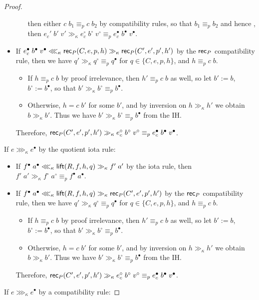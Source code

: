 \begin{proof}
\begin{itemize}
\begin{itemize}
then either $c\;b_1\equiv_p c\;b_2$ by compatibility rules, so that $b_1\equiv_p b_2$ and hence , then $e_c'\;b'\;v'\gg_\kappa e_c^\circ\;b^\circ\;v^\circ\equiv_p e_c^\bullet\;b^\bullet\;v^\bullet$.
\end{itemize}
\item If $e_c^\bullet\;b^\bullet\;v^\bullet\lll_\kappa \mathsf{rec}_P(C,e,p,h)\gg_\kappa \mathsf{rec}_P(C',e',p',h')$ by the $\mathsf{rec}_P$ compatibility rule, then we have $q'\gg_\kappa q^\circ\equiv_p q^\bullet$ for $q\in\{C,e,p,h\}$, and $h\equiv_p c\;b$.
\begin{itemize}
\item If $h\equiv_p c\;b$ by proof irrelevance, then $h'\equiv_p c\;b$ as well, so let $b':=b$, $b^\circ:=b^\bullet$, so that $b'\gg_\kappa b^\circ\equiv_p b^\bullet$.
\item Otherwise, $h=c\;b'$ for some $b'$, and by inversion on $h\gg_\kappa h'$ we obtain $b\gg_\kappa b'$. Thus we have $b'\gg_\kappa b^\circ\equiv_p b^\bullet$ from the IH.
\end{itemize}
Therefore, $\mathsf{rec}_P(C',e',p',h')\gg_\kappa e_c^\circ\;b^\circ\;v^\circ\equiv_p e_c^\bullet\;b^\bullet\;v^\bullet$.
\end{itemize}
\item If $e\ggg_\kappa e^\bullet$ by the quotient iota rule:
\begin{itemize}
\item If $f^\bullet\;a^\bullet\lll_\kappa \mathsf{lift}(R,f,h,q)\gg_\kappa f'\;a'$ by the iota rule, then $f'\;a'\gg_\kappa f^\circ\;a^\circ\equiv_p f^\bullet\;a^\bullet$.
\item If $f^\bullet\;a^\bullet\lll_\kappa \mathsf{lift}(R,f,h,q)\gg_\kappa \mathsf{rec}_P(C',e',p',h')$ by the $\mathsf{rec}_P$ compatibility rule, then we have $q'\gg_\kappa q^\circ\equiv_p q^\bullet$ for $q\in\{C,e,p,h\}$, and $h\equiv_p c\;b$.
\begin{itemize}
\item If $h\equiv_p c\;b$ by proof irrelevance, then $h'\equiv_p c\;b$ as well, so let $b':=b$, $b^\circ:=b^\bullet$, so that $b'\gg_\kappa b^\circ\equiv_p b^\bullet$.
\item Otherwise, $h=c\;b'$ for some $b'$, and by inversion on $h\gg_\kappa h'$ we obtain $b\gg_\kappa b'$. Thus we have $b'\gg_\kappa b^\circ\equiv_p b^\bullet$ from the IH.
\end{itemize}
Therefore, $\mathsf{rec}_P(C',e',p',h')\gg_\kappa e_c^\circ\;b^\circ\;v^\circ\equiv_p e_c^\bullet\;b^\bullet\;v^\bullet$.
\end{itemize}
\item If $e\ggg_\kappa e^\bullet$ by a compatibility rule:

\end{proof}
